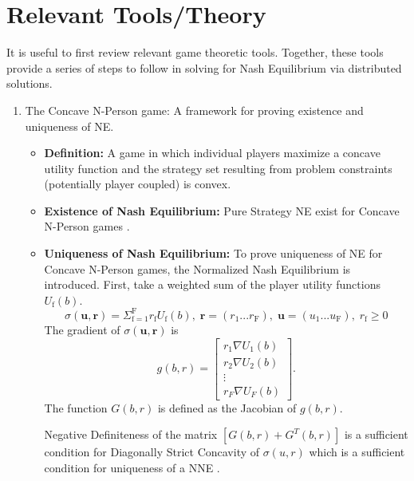 \documentclass[12pt,a4paper]{report}
\begin{document}
\section{Relevant Tools/Theory}
It is useful to first review relevant game theoretic tools. Together, these tools provide a series of steps to follow in solving for Nash Equilibrium via distributed solutions. 

\begin{enumerate}
\item The Concave N-Person game: A framework for proving existence and uniqueness of NE.

\begin{itemize}
\item
\textbf{Definition:} A game in which individual players maximize a concave utility function and the strategy set resulting from problem constraints (potentially player coupled) is convex. 
\item 
\textbf{Existence of Nash Equilibrium:} Pure Strategy NE exist for Concave N-Person  games \cite[Thm1]{rosen1964existence}. 
\item
\textbf{Uniqueness of Nash Equilibrium:} To prove uniqueness of NE for Concave N-Person  games, the Normalized Nash Equilibrium is introduced.
First, take a weighted sum of the player utility functions $U_{\mathrm{f}}(b)$.
\begin{equation*}
\sigma(\mathbf{u},\mathbf{r})  = \Sigma_{\mathrm{f=1}}^{\mathrm{F}} r_{\mathrm{f}}U_{\mathrm{f}}(b),\; \mathbf{r}=(r_{\text{1}}... r_{\text{F}})
,\; \mathbf{u}=(u_{\text{1}}... u_{\text{F}})
, \; 
r_{\mathrm{f}} \geq 0
\end{equation*}
The gradient of $
\sigma(\mathbf{u},\mathbf{r})$
is  
\begin{equation}
g(b,r)= 
\begin{bmatrix}
r_1 \nabla U_{1}(b)
\\
r_2 \nabla U_{2}(b)
\\
\vdots\\
r_F \nabla U_{F}(b)
\end{bmatrix}.
\end{equation}
 The function $G(b,r) $ is defined as the Jacobian of $g(b,r) $.



Negative Definiteness of the matrix $[G(b,r)+G^{T}(b,r)] $ is a sufficient condition for Diagonally Strict Concavity of $\sigma(u,r)$ which is a sufficient condition for uniqueness of a NNE \cite[Thm4]{rosen1964existence}.



\end{itemize}
\end{enumerate}
\end{document}
